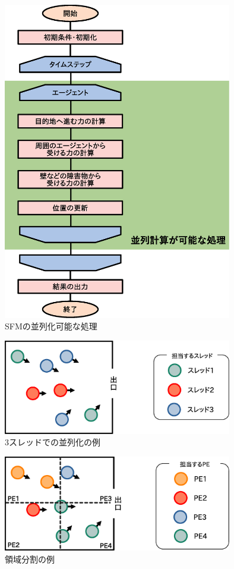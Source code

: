 \begin{figure}[hp]
 \begin{center}
  \includegraphics[width=10cm,clip]{figure/heiretuka_sfm.eps}
  \caption{SFMの並列化可能な処理}
  \label{fig:atigenshou}
 \end{center}
\end{figure}

\begin{figure}[hp]
 \begin{center}
  \includegraphics[width=10cm,clip]{figure/sureddo_heiretu.eps}
  \caption{3スレッドでの並列化の例}
  \label{fig:atigenshou}
 \end{center}
\end{figure}


\begin{figure}[hbtp]
 \begin{center}
  \includegraphics[width=10cm,clip]{figure/ryoiki_heiretu.eps}
  \caption{領域分割の例}
  \label{fig:atigenshou}
 \end{center}
\end{figure}



